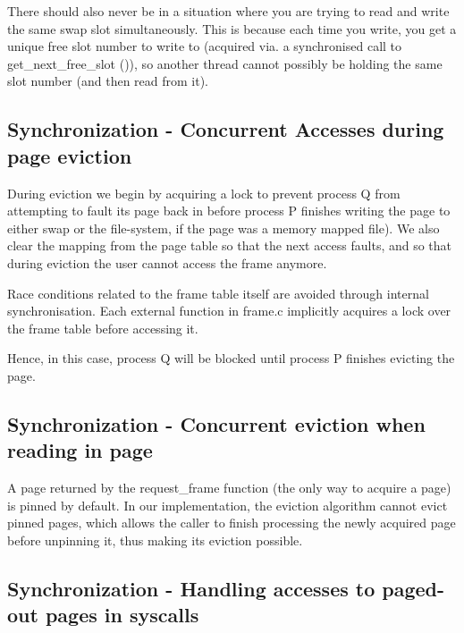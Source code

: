 There should also never be in a situation where you are trying to read and write the same swap slot simultaneously. This is because each time you write, you get a unique free slot number to write to (acquired via. a synchronised call to get\_next\_free\_slot ()), so another thread cannot possibly be holding the same slot number (and then read from it).

\subsection{Synchronization - Concurrent Accesses during page eviction}

During eviction we begin by acquiring a lock to prevent process Q from attempting to fault its page back in before process P finishes writing the page to either swap or the file-system, if the page was a memory mapped file). We also clear the mapping from the page table so that the next access faults, and so that during eviction the user cannot access the frame anymore.

Race conditions related to the frame table itself are avoided through internal synchronisation. Each external function in frame.c implicitly acquires a lock over the frame table before accessing it.

Hence, in this case, process Q will be blocked until process P finishes evicting the page.

\subsection{Synchronization - Concurrent eviction when reading in page}

A page returned by the request\_frame function (the only way to acquire a page) is pinned by default.
In our implementation, the eviction algorithm cannot evict pinned pages, which allows the caller to finish processing the newly acquired page before unpinning it, thus making its eviction possible.

\subsection{Synchronization - Handling accesses to paged-out pages in syscalls}

